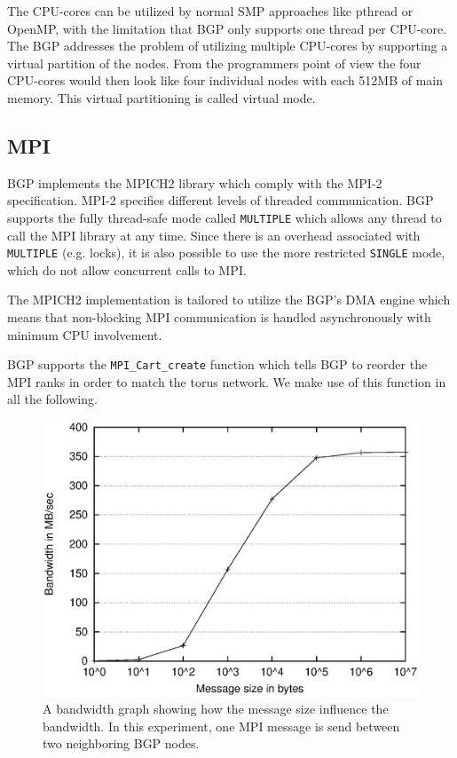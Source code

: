 \documentclass[conference]{IEEEtran}
\begin{document}
The CPU-cores can be utilized by normal SMP approaches like pthread or OpenMP, with the limitation that BGP only supports one thread per CPU-core. The BGP addresses the problem of utilizing multiple CPU-cores by supporting a virtual partition of the nodes. From the programmers point of view the four CPU-cores would then look like four individual nodes with each 512MB of main memory. This virtual partitioning is called virtual mode.

\subsection{MPI}
BGP implements the MPICH2 library which comply with the MPI-2 specification\cite{mpi2}. MPI-2 specifies different levels of threaded communication. BGP supports the fully thread-safe mode called \texttt{MULTIPLE} which allows any thread to call the MPI library at any time. Since there is an overhead associated with \texttt{MULTIPLE} (e.g. locks), it is also possible to use the more restricted \texttt{SINGLE} mode, which do not allow concurrent calls to MPI.

The MPICH2 implementation is tailored to utilize the BGP's DMA engine which means that non-block\-ing MPI communication is handled asynchronously with minimum CPU involvement.

BGP supports the \texttt{MPI\_Cart\_create} function which tells BGP to reorder the MPI ranks in order to match the torus network. We make use of this function in all the following.

\begin{figure}
 \centering
 \includegraphics[width=\linewidth]{gfx/bgp_batchsize}
 \caption{A bandwidth graph showing how the message size influence the bandwidth. In this experiment, one MPI message is send between two neighboring BGP nodes.}
 \label{fig:batchsize}
\end{figure}
\end{document}
